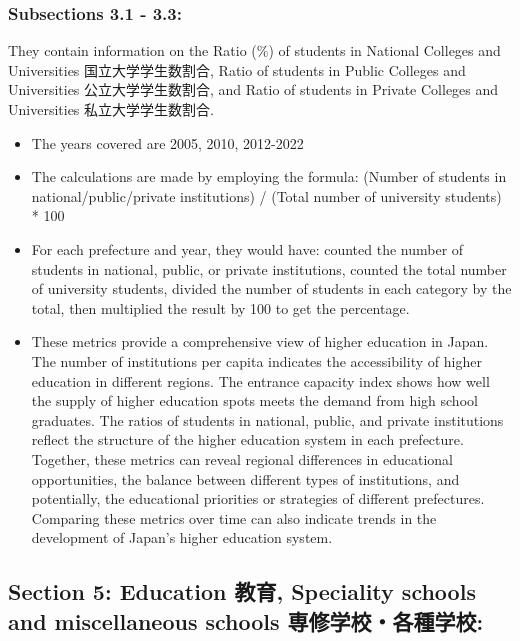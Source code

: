 \documentclass[
]{ltjarticle}
\begin{document}
\hypertarget{subsections-3.1---3.3-1}{%
\subsubsection{Subsections 3.1 - 3.3:}\label{subsections-3.1---3.3-1}}

They contain information on the Ratio (\%) of students in National
Colleges and Universities 国立大学学生数割合, Ratio of students in
Public Colleges and Universities 公立大学学生数割合, and Ratio of
students in Private Colleges and Universities 私立大学学生数割合.

\begin{itemize}
\item
  The years covered are 2005, 2010, 2012-2022
\item
  The calculations are made by employing the formula: (Number of
  students in national/public/private institutions) / (Total number of
  university students) * 100
\item
  For each prefecture and year, they would have: counted the number of
  students in national, public, or private institutions, counted the
  total number of university students, divided the number of students in
  each category by the total, then multiplied the result by 100 to get
  the percentage.
\item
  These metrics provide a comprehensive view of higher education in
  Japan. The number of institutions per capita indicates the
  accessibility of higher education in different regions. The entrance
  capacity index shows how well the supply of higher education spots
  meets the demand from high school graduates. The ratios of students in
  national, public, and private institutions reflect the structure of
  the higher education system in each prefecture. Together, these
  metrics can reveal regional differences in educational opportunities,
  the balance between different types of institutions, and potentially,
  the educational priorities or strategies of different prefectures.
  Comparing these metrics over time can also indicate trends in the
  development of Japan's higher education system.
\end{itemize}

\hypertarget{section-5-education-ux6559ux80b2-speciality-schools-and-miscellaneous-schools-ux5c02ux4feeux5b66ux6821ux5404ux7a2eux5b66ux6821}{%
\subsection{Section 5: Education 教育, Speciality schools and
miscellaneous schools
専修学校・各種学校:}\label{section-5-education-ux6559ux80b2-speciality-schools-and-miscellaneous-schools-ux5c02ux4feeux5b66ux6821ux5404ux7a2eux5b66ux6821}}
\end{document}
